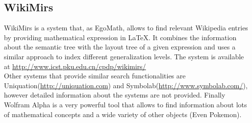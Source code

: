 \subsection{WikiMirs}
WikiMirs\cite{wikimirs} is a system that, as EgoMath, allows to find relevant Wikipedia entries by providing mathematical expression in \LaTeX. It combines the information about the semantic tree with the layout tree of a given expression and uses a similar approach to index different generalization levels. The system is available at \url{http://www.icst.pku.edu.cn/cpdp/wikimirs/} \\


Other systems that provide similar search functionalities are Uniquation(\url{http://uniquation.com}) and Symbolab(\url{http://www.symbolab.com/}), however detailed information about the systems are not provided. Finally Wolfram Alpha\cite{wolframalpha} is a very powerful tool that allows to find information about lots of mathematical concepts and a wide variety of other objects (Even Pokemon).


